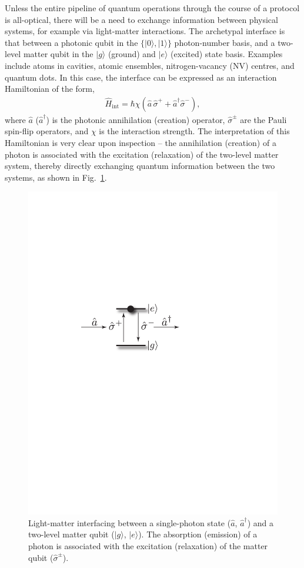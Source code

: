\documentclass[aps,rmp,twocolumn,amsmath,amssymb,nofootinbib,superscriptaddress,longbibliography,floatfix]{revtex4-1}
\newcommand{\ket}[1]{|#1\rangle}
\begin{document}
Unless the entire pipeline of quantum operations through the course of a protocol is all-optical, there will be a need to exchange information between physical systems, for example via light-matter interactions. The archetypal interface is that between a photonic qubit in the \mbox{$\{\ket{0},\ket{1}\}$} photon-number basis, and a two-level matter qubit in the $\ket{g}$ (ground) and $\ket{e}$ (excited) state basis. Examples include atoms in cavities, atomic ensembles, nitrogen-vacancy (NV) centres, and quantum dots. In this case, the interface can be expressed as an interaction Hamiltonian of the form,
\begin{align} \label{eq:two_level_hamil}
\hat{H}_\mathrm{int} = \hbar \chi (\hat{a}\,\hat\sigma^+ + \hat{a}^\dag\hat\sigma^-),
\end{align}
where $\hat{a}$ ($\hat{a}^\dag$) is the photonic annihilation (creation) operator, $\hat\sigma^\pm$ are the Pauli spin-flip operators, and $\chi$ is the interaction strength. The interpretation of this Hamiltonian is very clear upon inspection -- the annihilation (creation) of a photon is associated with the excitation (relaxation) of the two-level matter system, thereby directly exchanging quantum information between the two systems, as shown in Fig.~\ref{fig:opt_int}.

\begin{figure}[!htb]
\includegraphics[width=0.6\columnwidth]{opt_inter}
\caption{Light-matter interfacing between a single-photon state ($\hat{a}$, $\hat{a}^\dag$) and a two-level matter qubit ($\ket{g}$, $\ket{e}$). The absorption (emission) of a photon is associated with the excitation (relaxation) of the matter qubit ($\hat\sigma^\pm$).} \label{fig:opt_int}
\end{figure}
\end{document}
